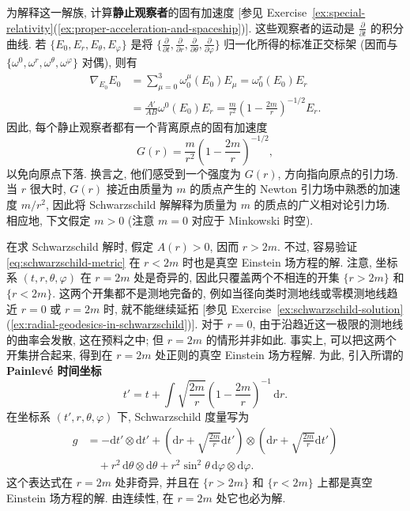 为解释这一解族, 计算\textbf{静止观察者}的固有加速度 [参见 Exercise~\ref{ex:special-relativity}(\ref{ex:proper-acceleration-and-spaceship})]. 这些观察者的运动是 $\frac{\partial}{\partial t}$ 的积分曲线. 若 $\{E_0,E_r,E_\theta,E_\varphi\}$ 是将 $\{\frac{\partial}{\partial t},\frac{\partial}{\partial r},\frac{\partial}{\partial\theta},\frac{\partial}{\partial\varphi}\}$ 归一化所得的标准正交标架 (因而与 $\{\omega^0,\omega^r,\omega^\theta,\omega^\varphi\}$ 对偶), 则有
\begin{align*}
  \nabla_{E_0}E_0
   &=\sum_{\mu=0}^3\omega_0^\mu(E_0)E_\mu=\omega_0^r(E_0)E_r\\
   &=\frac{A'}{AB}\omega^0(E_0)E_r
     =\frac{m}{r^2}\left(1-\frac{2m}{r}\right)^{-1/2}E_r.
\end{align*}
因此, 每个静止观察者都有一个背离原点的固有加速度
\[
  G(r)=\frac{m}{r^2}\left(1-\frac{2m}{r}\right)^{-1/2},
\]
以免向原点下落. 换言之, 他们感受到一个强度为 $G(r)$, 方向指向原点的引力场. 当 $r$ 很大时, $G(r)$ 接近由质量为 $m$ 的质点产生的 Newton 引力场中熟悉的加速度 $m/r^2$, 因此将 Schwarzschild 解解释为质量为 $m$ 的质点的广义相对论引力场. 相应地, 下文假定 $m>0$ (注意 $m=0$ 对应于 Minkowski 时空).

在求 Schwarzschild 解时, 假定 $A(r)>0$, 因而 $r>2m$. 不过, 容易验证 \eqref{eq:schwarzschild-metric} 在 $r<2m$ 时也是真空 Einstein 场方程的解. 注意, 坐标系 $(t,r,\theta,\varphi)$ 在 $r=2m$ 处是奇异的, 因此只覆盖两个不相连的开集 $\{r>2m\}$ 和 $\{r<2m\}$. 这两个开集都不是测地完备的, 例如当径向类时测地线或零模测地线趋近 $r=0$ 或 $r=2m$ 时, 就不能继续延拓 [参见 Exercise~\ref{ex:schwarzschild-solution}(\ref{ex:radial-geodesics-in-schwarzschild})]. 对于 $r=0$, 由于沿趋近这一极限的测地线的曲率会发散, 这在预料之中; 但 $r=2m$ 的情形并非如此. 事实上, 可以把这两个开集拼合起来, 得到在 $r=2m$ 处正则的真空 Einstein 场方程解. 为此, 引入所谓的 \textbf{Painlevé 时间坐标}
\[
  t'=t+\int\sqrt{\frac{2m}{r}}\left(1-\frac{2m}{r}\right)^{-1}\,\mathrm{d}r.
\]
在坐标系 $(t',r,\theta,\varphi)$ 下, Schwarzschild 度量写为
\begin{align*}
  g&=-\mathrm{d}t'\otimes\mathrm{d}t'
       +\left(\mathrm{d}r+\sqrt{\frac{2m}{r}}\mathrm{d}t'\right)
             \otimes\left(\mathrm{d}r+\sqrt{\frac{2m}{r}}\mathrm{d}t'\right)\\
   &\quad+r^2\,\mathrm{d}\theta\otimes\mathrm{d}\theta
        +r^2\sin^2\theta\,\mathrm{d}\varphi\otimes\mathrm{d}\varphi.
\end{align*}
这个表达式在 $r=2m$ 处非奇异, 并且在 $\{r>2m\}$ 和 $\{r<2m\}$ 上都是真空 Einstein 场方程的解. 由连续性, 在 $r=2m$ 处它也必为解.

